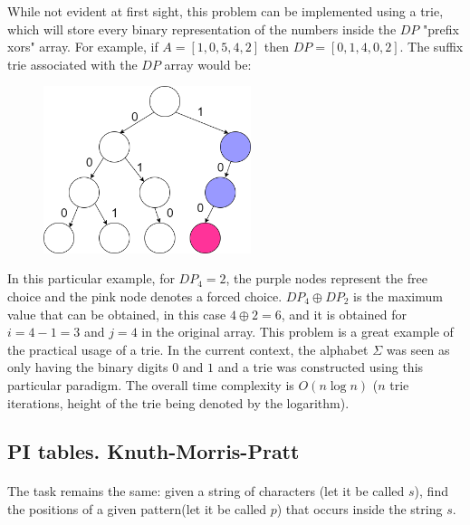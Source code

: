 \documentclass[letterpaper]{article}
\begin{document}
While not evident at first sight, this problem can be implemented using a trie, which will store every binary representation of the numbers inside the $DP$ "prefix xors" array. For example, if $A = [1, 0, 5, 4, 2]$ then $DP = [0, 1, 4, 0, 2]$. The suffix trie associated with the $DP$ array would be:

\newpage

\begin{figure} [h!]
\centering
\includegraphics[width=0.54\textwidth]{pngOfDiagrams/xormax (1).png}
\end{figure}

In this particular example, for $DP_{4} = 2$, the purple nodes represent the free choice and the pink node denotes a forced choice. $DP_4 \oplus DP_2$ is the maximum value that can be obtained, in this case $4 \oplus 2 = 6$, and it is obtained for $i = 4 - 1 = 3$ and $j = 4$ in the original array. This problem is a great example of the practical usage of a trie. In the current context, the alphabet $\Sigma$ was seen as only having the binary digits $0$ and $1$ and a trie was constructed using this particular paradigm. The overall time complexity is $O(n \log n)$ ($n$ trie iterations, height of the trie being denoted by the logarithm).

\newpage



\newpage

\subsection{PI tables. Knuth-Morris-Pratt}

\paragraph{}

The task remains the same: given a string of characters (let it be called $s$), find the positions of a given pattern(let it be called $p$) that occurs inside the string $s$.
\end{document}
